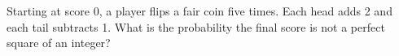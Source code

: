 Starting at score 0, a player flips a fair coin five times. Each head adds 2 and each tail subtracts 1. What is the probability the final score is not a perfect square of an integer?
